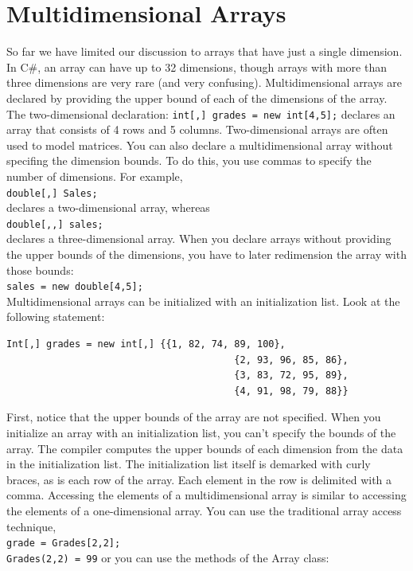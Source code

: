 \documentclass[12pt,a4paper,final,twoside,titlepage]{book}
\begin{document}
\section{Multidimensional Arrays}
So far we have limited our discussion to arrays that have just a single dimension. In C\#, an array can have up to 32 dimensions, though arrays with more than three dimensions are very rare (and very confusing). Multidimensional arrays are declared by providing the upper bound of each of the dimensions of the array. The two-dimensional declaration:
\texttt{int[,] grades = new int[4,5];}
declares an array that consists of 4 rows and 5 columns. Two-dimensional arrays are often used to model matrices.
You can also declare a multidimensional array without specifing the dimension bounds. To do this, you use commas to specify the number of dimensions. For example,\\
\texttt{double[,] Sales;}\\
declares a two-dimensional array, whereas\\
\texttt{double[,,] sales;}\\
declares a three-dimensional array. When you declare arrays without providing the upper bounds of the dimensions, you have to later redimension the array with those bounds:\\
\texttt{sales = new double[4,5];}\\
Multidimensional arrays can be initialized with an initialization list. Look at the following statement:\\
\begin{lstlisting}
Int[,] grades = new int[,] {{1, 82, 74, 89, 100}, 
										{2, 93, 96, 85, 86}, 
										{3, 83, 72, 95, 89}, 
										{4, 91, 98, 79, 88}}
\end{lstlisting}
First, notice that the upper bounds of the array are not specified. When you initialize an array with an initialization list, you can’t specify the bounds of the array. The compiler computes the upper bounds of each dimension from the data in the initialization list. The initialization list itself is demarked with curly braces, as is each row of the array. Each element in the row is delimited with a comma.
Accessing the elements of a multidimensional array is similar to accessing the elements of a one-dimensional array. You can use the traditional array access technique,\\
\texttt{grade = Grades[2,2];\\Grades(2,2) = 99}
or you can use the methods of the Array class:\\
\end{document}
